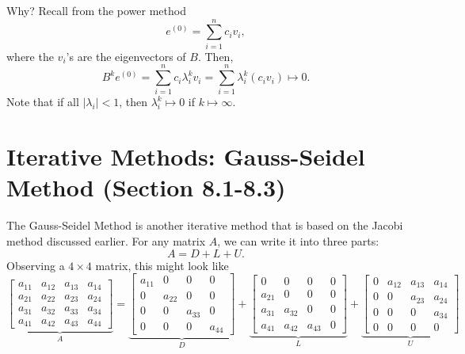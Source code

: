 \documentclass[letterpaper]{article}
\newcommand{\0}{\mathbf{0}}
\begin{document}
\bigskip 

Why? Recall from the power method 
\[e^{(0)} = \sum_{i = 1}^{n} c_i v_i,\]
where the $v_i$'s are the eigenvectors of $B$. Then, 
\[B^k e^{(0)} = \sum_{i = 1}^{n} c_i \lambda_i^k v_i = \sum_{i = 1}^{n} \lambda_i^k (c_i v_i) \mapsto 0.\] Note that if all $|\lambda_i| < 1$, then $\lambda_i^k \mapsto 0$ if $k \mapsto \infty$.  


\section{Iterative Methods: Gauss-Seidel Method (Section 8.1-8.3)}
The Gauss-Seidel Method is another iterative method that is based on the Jacobi method discussed earlier. For any matrix $A$, we can write it into three parts: 
\[A = D + L + U.\]
Observing a $4 \times 4$ matrix, this might look like 
\[\underbrace{\begin{bmatrix}
    a_{11} & a_{12} & a_{13} & a_{14} \\ 
    a_{21} & a_{22} & a_{23} & a_{24} \\ 
    a_{31} & a_{32} & a_{33} & a_{34} \\ 
    a_{41} & a_{42} & a_{43} & a_{44} 
\end{bmatrix}}_{A} = \underbrace{\begin{bmatrix}
    a_{11} & 0 & 0 & 0 \\ 
    0 & a_{22} & 0 & 0 \\ 
    0 & 0 & a_{33} & 0 \\ 
    0 & 0 & 0 & a_{44} 
\end{bmatrix}}_{D} + \underbrace{\begin{bmatrix}
    0 & 0 & 0 & 0  \\
    a_{21} & 0 & 0 & 0 \\ 
    a_{31} & a_{32} & 0 & 0 \\ 
    a_{41} & a_{42} & a_{43} & 0 
\end{bmatrix}}_{L} + \underbrace{\begin{bmatrix}
    0 & a_{12} & a_{13} & a_{14} \\ 
    0 & 0 & a_{23} & a_{24}  \\
    0 & 0 & 0 & a_{34}  \\
    0 & 0 & 0 & 0
\end{bmatrix}}_{U}\]
\end{document}
